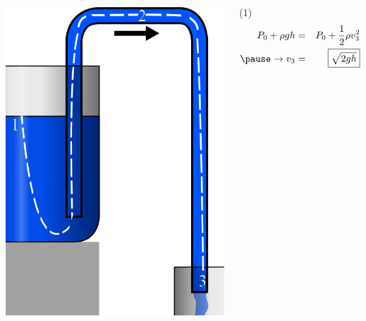 \documentclass[]{beamer}
\begin{document}



    \begin{frame}


      \begin{columns}[c]
        \column{2in}  %
     
        \begin{center}
          \includegraphics[height=2.in]{images2/Syphon_streamline.png}
        \end{center}

        \column{2.8in}
     
        \textcolor{mypink1}{  (1) 
        \begin{eqnarray*}
        P_0+\rho g h&=&P_0+\frac{1}{2} \rho v_3^2\\
          \pause
          \rightarrow v_3&=& \boxed{\sqrt{2gh}}\\
        \end{eqnarray*}
              }

        \end{columns}
     


    
      \end{frame}


\end{document}

